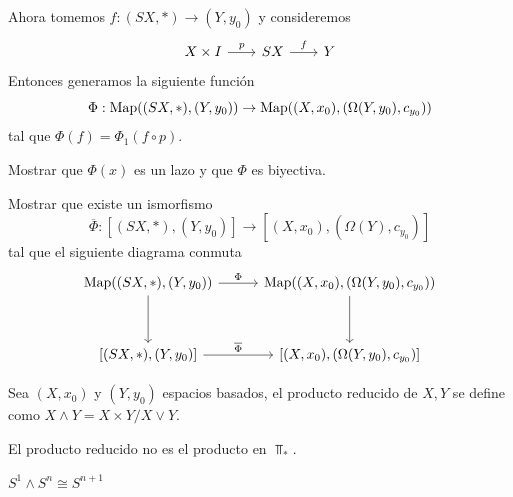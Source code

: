 Ahora tomemos $f:(SX,*)\to(Y,y_0)$ y consideremos
\begin{equation*}
    \begin{tikzcd}[column sep=0.7cm]
        X\times I\arrow[r,"p"] & SX\arrow[r,"f"] & Y
    \end{tikzcd}
\end{equation*}
Entonces generamos la siguiente función
\begin{equation*}
    \Phi:\mathrm{Map}((SX,*),(Y,y_0))\to \mathrm{Map}((X,x_0),(\Omega(Y,y_0),c_{y_0}))
\end{equation*}
tal que $\Phi(f)=\Phi_1(f\circ p)$.
\begin{ejercicio}
    Mostrar que $\Phi(x)$ es un lazo y que $\Phi$ es biyectiva.
\end{ejercicio}
\begin{ejercicio}
    Mostrar que existe un ismorfismo 
    $$\overline{\Phi}:[(SX,*),(Y,y_0)]\to [(X,x_0),(\Omega(Y),c_{y_0})]$$
    tal que el siguiente diagrama conmuta
    \begin{equation*}
    \begin{tikzcd}[column sep=1cm, row sep=1.2cm]
        \map((SX,*),(Y,y_0)) \arrow[r, "\Phi"] \arrow[d] & \map((X,x_0),(\Omega(Y,y_0),c_{y_0})) \arrow[d] \\
        {[(SX,*),(Y,y_0)]} \arrow[r, "\overline{\Phi}"] & {[(X,x_0),(\Omega(Y,y_0),c_{y_0})]}
    \end{tikzcd}
\end{equation*}
\end{ejercicio}
\begin{definicion}
    Sea $(X,x_0)$ y $(Y,y_0)$ espacios basados, el producto reducido de $X,Y$ se define como $X\wedge Y=X\times Y/X\vee Y$.
\end{definicion}
\begin{nota}
    El producto reducido no es el producto en $\Top_*$.
\end{nota}
\begin{prop}
\label{prop:S1 wedge Sn cong Sn+1}
    $S^1\wedge S^n\cong S^{n+1}$
\end{prop}
